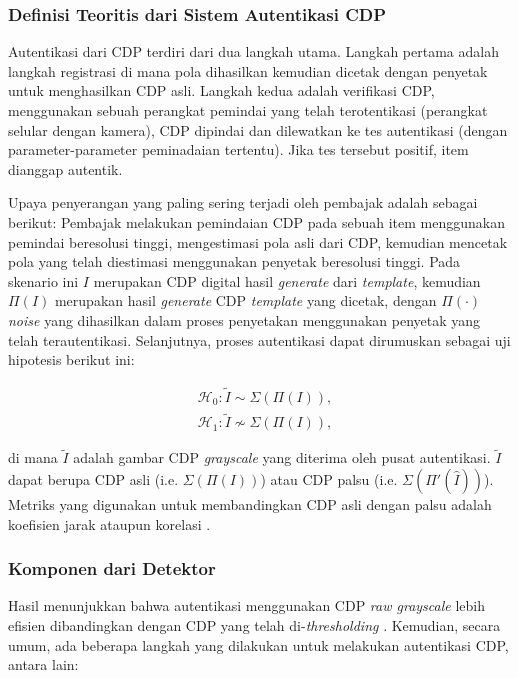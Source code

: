 \subsubsection{Definisi Teoritis dari Sistem Autentikasi CDP}
Autentikasi dari CDP terdiri dari dua langkah utama. Langkah pertama adalah langkah registrasi di mana pola dihasilkan kemudian dicetak dengan penyetak untuk menghasilkan CDP asli. Langkah kedua adalah verifikasi CDP, menggunakan sebuah perangkat pemindai yang telah terotentikasi (perangkat selular dengan kamera), CDP dipindai dan dilewatkan ke tes autentikasi (dengan parameter-parameter peminadaian tertentu). Jika tes tersebut positif, item dianggap autentik.

Upaya penyerangan yang paling sering terjadi oleh pembajak adalah sebagai berikut: Pembajak melakukan pemindaian CDP pada sebuah item menggunakan pemindai beresolusi tinggi, mengestimasi pola asli dari CDP, kemudian mencetak pola yang telah diestimasi menggunakan penyetak beresolusi tinggi. Pada skenario ini $I$ merupakan CDP digital hasil \emph{generate} dari \emph{template}, kemudian $\Pi(I)$ merupakan hasil \emph{generate} CDP \emph{template} yang dicetak, dengan $\Pi(\cdot)$ \emph{noise} yang dihasilkan dalam proses penyetakan menggunakan penyetak yang telah terautentikasi. Selanjutnya, proses autentikasi dapat dirumuskan sebagai uji hipotesis berikut ini:

\begin{align}
	&\mathcal{H}_{0}:\tilde{I}\sim\Sigma(\Pi(I)),\\ &\mathcal{H}_{1}:\tilde{I}\not\sim\Sigma(\Pi(I)),\nonumber
\end{align}

\noindent di mana $\widetilde{I}$ adalah gambar CDP \emph{grayscale} yang diterima oleh pusat autentikasi. $\widetilde{I}$ dapat berupa CDP asli (i.e. $\Sigma(\Pi(I))$) atau CDP palsu (i.e. $\Sigma(\Pi'(\hat{I}))$). Metriks yang digunakan untuk membandingkan CDP asli dengan palsu adalah koefisien jarak ataupun korelasi \cite{dirik2012copy}.

\subsubsection{Komponen dari Detektor}
Hasil menunjukkan bahwa autentikasi menggunakan CDP \emph{raw grayscale} lebih efisien dibandingkan dengan CDP yang telah di-\emph{thresholding} \cite{phan2014document}. Kemudian, secara umum, ada beberapa langkah yang dilakukan untuk melakukan autentikasi CDP, antara lain:

